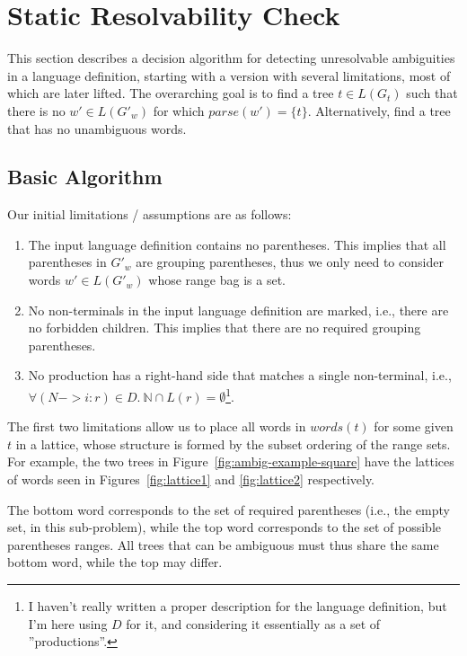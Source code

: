 \documentclass[acmsmall,review,anonymous]{acmart}\settopmatter{printfolios=true,printccs=false,printacmref=false}
\newcommand{\NT}{\mathbb{N}} %
\newcommand{\parse}{\mathit{parse}} %
\newcommand{\words}{\mathit{words}} %
\begin{document}
\section{Static Resolvability Check}

This section describes a decision algorithm for detecting unresolvable ambiguities in a language definition, starting with a version with several limitations, most of which are later lifted. The overarching goal is to find a tree $t \in L(G_t)$ such that there is no $w' \in L(G'_w)$ for which $\parse(w') = \{t\}$. Alternatively, find a tree that has no unambiguous words.

\subsection{Basic Algorithm}

Our initial limitations / assumptions are as follows:

\begin{enumerate}
  \item The input language definition contains no parentheses. This implies that all parentheses in $G'_w$ are grouping parentheses, thus we only need to consider words $w' \in L(G'_w)$ whose range bag is a set.

  \item No non-terminals in the input language definition are marked, i.e., there are no forbidden children. This implies that there are no required grouping parentheses.

  \item No production has a right-hand side that matches a single non-terminal, i.e., $\forall (N->i:r) \in D.\ \NT \cap L(r) = \emptyset$\footnote{I haven't really written a proper description for the language definition, but I'm here using $D$ for it, and considering it essentially as a set of ''productions''.}.
\end{enumerate}

\noindent The first two limitations allow us to place all words in $\words(t)$ for some given $t$ in a lattice, whose structure is formed by the subset ordering of the range sets. For example, the two trees in Figure~\ref{fig:ambig-example-square} have the lattices of words seen in Figures~\ref{fig:lattice1} and \ref{fig:lattice2} respectively.

The bottom word corresponds to the set of required parentheses (i.e., the empty set, in this sub-problem), while the top word corresponds to the set of possible parentheses ranges. All trees that can be ambiguous must thus share the same bottom word, while the top may differ.
\end{document}
